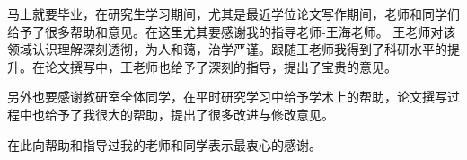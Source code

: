 
马上就要毕业，在研究生学习期间，尤其是最近学位论文写作期间，老师和同学们给予了很多帮助和意见。在这里尤其要感谢我的指导老师-王海老师。
王老师对该领域认识理解深刻透彻，为人和蔼，治学严谨。跟随王老师我得到了科研水平的提升。在论文撰写中，王老师也给予了深刻的指导，提出了宝贵的意见。

另外也要感谢教研室全体同学，在平时研究学习中给予学术上的帮助，论文撰写过程中也给予了我很大的帮助，提出了很多改进与修改意见。

在此向帮助和指导过我的老师和同学表示最衷心的感谢。

